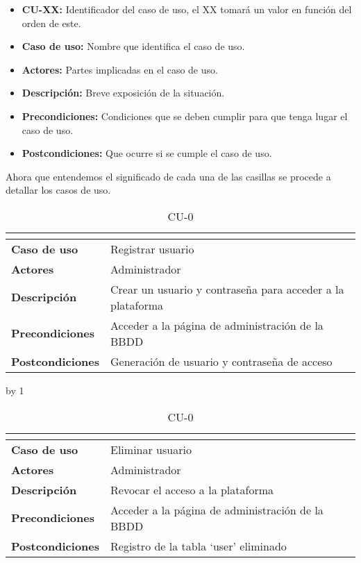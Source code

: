 \begin{itemize}
	\item \textbf{CU-XX:} Identificador del caso de uso, el XX tomará un valor en función del orden de este.
	\item \textbf{Caso de uso:} Nombre que identifica el caso de uso.
	\item \textbf{Actores:} Partes implicadas en el caso de uso.
	\item \textbf{Descripción:} Breve exposición de la situación.
	\item \textbf{Precondiciones:} Condiciones que se deben cumplir para que tenga lugar el caso de uso.
	\item \textbf{Postcondiciones:} Que ocurre si se cumple el caso de uso.
\end{itemize}

Ahora que entendemos el significado de cada una de las casillas se procede a detallar los casos de uso.
\newcount\cu
{}
\begin{table}[H]
	\centering
	\caption{CU-0\number\cu}
	\begin{tabular}{|l|p{}|}
		\hline
		\multicolumn{2}{|c|}{\cellcolor[HTML]{BFBFBF}{\color[HTML]{000000} \textbf{CU-0\number\cu}}} \\ \hline
		\textbf{Caso de uso}     & Registrar usuario                                          \\ \hline
		\textbf{Actores}         & Administrador                                              \\ \hline
		\textbf{Descripción}     & Crear un usuario y contraseña para acceder a la plataforma \\ \hline
		\textbf{Precondiciones}  & Acceder a la página de administración de la BBDD           \\ \hline
		\textbf{Postcondiciones} & Generación de usuario y contraseña de acceso               \\ \hline
	\end{tabular}
\end{table}
\advance\cu by 1
\begin{table}[H]
	\centering
	\caption{CU-0\number\cu}
	\begin{tabular}{|l|p{}|}
		\hline
		\multicolumn{2}{|c|}{\cellcolor[HTML]{BFBFBF}{\color[HTML]{000000} \textbf{CU-0\number\cu}}} \\ \hline
		\textbf{Caso de uso}     & Eliminar usuario                                 \\ \hline
		\textbf{Actores}         & Administrador                                    \\ \hline
		\textbf{Descripción}     & Revocar el acceso a la plataforma                \\ \hline
		\textbf{Precondiciones}  & Acceder a la página de administración de la BBDD \\ \hline
		\textbf{Postcondiciones} & Registro de la tabla ‘user’ eliminado            \\ \hline
	\end{tabular}
\end{table}
